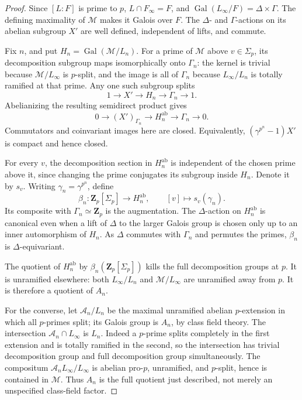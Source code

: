 \begin{proof}
Since \([L:F]\) is prime to \(p\),
\(L\cap F_\infty=F\), and
\(\operatorname{Gal}(L_\infty/F)=\Delta\times\Gamma\).
The defining maximality of \(\mathcal M\) makes it Galois over \(F\).
The \(\Delta\)- and \(\Gamma\)-actions on its abelian subgroup \(X'\)
are well defined, independent of lifts, and commute.

Fix \(n\), and put \(H_n=\operatorname{Gal}(\mathcal M/L_n)\).
For a prime of \(\mathcal M\) above \(v\in\Sigma_p\), its
decomposition subgroup maps isomorphically onto \(\Gamma_n\):
the kernel is trivial because \(\mathcal M/L_\infty\) is
\(p\)-split, and the image is all of \(\Gamma_n\) because
\(L_\infty/L_n\) is totally ramified at that prime.
Any one such subgroup splits
\[
                 1\longrightarrow X'\longrightarrow H_n
                         \longrightarrow\Gamma_n\longrightarrow1.
\]
Abelianizing the resulting semidirect product gives
\[
       0\longrightarrow (X')_{\Gamma_n}
         \longrightarrow H_n^{\mathrm{ab}}
         \longrightarrow\Gamma_n\longrightarrow0.
                                                               \tag{G74.10}
\]
Commutators and coinvariant images here are closed.  Equivalently,
\((\gamma^{p^n}-1)X'\) is compact and hence closed.

For every \(v\), the decomposition section in
\(H_n^{\mathrm{ab}}\) is independent of the chosen prime above it,
since changing the prime conjugates its subgroup inside \(H_n\).
Denote it by \(s_v\).
Writing \(\gamma_n=\gamma^{p^n}\), define
\[
 \beta_n:\mathbf Z_p[\Sigma_p]\longrightarrow H_n^{\mathrm{ab}},
                 \qquad [v]\longmapsto s_v(\gamma_n).
                                                               \tag{G74.11}
\]
Its composite with \(\Gamma_n\simeq\mathbf Z_p\) is the augmentation.
The \(\Delta\)-action on \(H_n^{\mathrm{ab}}\) is canonical even
when a lift of \(\Delta\) to the larger Galois group is chosen
only up to an inner automorphism of \(H_n\).
As \(\Delta\) commutes with \(\Gamma_n\) and permutes the primes,
\(\beta_n\) is \(\Delta\)-equivariant.

The quotient of \(H_n^{\mathrm{ab}}\) by
\(\beta_n(\mathbf Z_p[\Sigma_p])\) kills the full decomposition
groups at \(p\).  It is unramified elsewhere: both
\(L_\infty/L_n\) and \(\mathcal M/L_\infty\) are unramified
away from \(p\).  It is therefore a quotient of \(A_n\).

For the converse, let \(\mathcal A_n/L_n\) be the maximal
unramified abelian \(p\)-extension in which all \(p\)-primes split;
its Galois group is \(A_n\), by class field theory.
The intersection \(\mathcal A_n\cap L_\infty\) is \(L_n\).
Indeed a \(p\)-prime splits completely in the first extension
and is totally ramified in the second, so the intersection
has trivial decomposition group and full decomposition group
simultaneously.
The compositum \(\mathcal A_n L_\infty/L_\infty\) is abelian
pro-\(p\), unramified, and \(p\)-split, hence is contained in
\(\mathcal M\).  Thus \(A_n\) is the full quotient just described,
not merely an unspecified class-field factor.


\end{proof}
